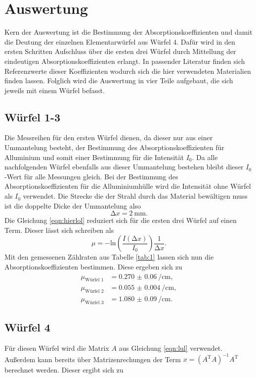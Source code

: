 \section{Auswertung}
Kern der Auswertung ist die Bestimmung der Absorptionskoeffizienten und damit die Deutung der einzelnen Elementarwürfel aus Würfel 4.
Dafür wird in den ersten Schritten Aufschluss über die ersten drei Würfel durch Mittellung der eindeutigen Absorptionskoeffizienten erlangt. 
In passender Literatur \cite{wqs} finden sich Referenzwerte dieser Koeffizienten wodurch sich die hier verwendeten Materialien finden lassen.  
Folglich wird die Auswertung in vier Teile aufgebaut, die sich jeweils mit einem Würfel befasst. 

\subsection{Würfel 1-3}
Die Messreihen für den ersten Würfel dienen, da dieser nur aus einer Ummantelung besteht, der Bestimmung des Absorptionskoeffizienten für Alluminium und somit einer Bestimmung 
für die Intensität $I_0$. Da alle nachfolgenden Würfel ebenfalls aus dieser Ummantelung bestehen bleibt dieser $I_0$-Wert für alle Messungen gleich. Bei der Bestimmung des Absorptionskoeffizienten für die Alluminiumhülle
wird die Intensität ohne Würfel als $I_0$ verwendet. 
Die Strecke die der Strahl durch das Material bewältigen muss ist die doppelte Dicke der Ummantelung also
\begin{equation*}
    \increment x = \SI{2}{\milli\meter}.
\end{equation*}
Die Gleichung \eqref{eqn:hierlol} reduziert sich für die ersten drei Würfel auf einen Term. Dieser lässt sich schreiben als
\begin{equation*}
\mu = - \text{ln} \left( \frac{I(\increment x)}{I_0} \right) \frac{1}{\increment x}.
\end{equation*}
Mit den gemessenen Zählraten aus Tabelle \ref{tab:1} lassen sich nun die Absorptionskoeffizienten bestimmen. Diese ergeben sich zu
\begin{align*}
\mu_{\text{Würfel 1}} &= \SI{0.270(60)}{\per\centi\meter},\\
\mu_{\text{Würfel 2}} &= \SI{0.055(4)}{\per\centi\meter},\\
\mu_{\text{Würfel 3}} &= \SI{1.080(90)}{\per\centi\meter}. 
\end{align*}
\subsection{Würfel 4}
Für diesen Würfel wird die Matrix $A$ aus Gleichung \eqref{eqn:lul} verwendet. Außerdem kann bereits über Matrizenrechungen der Term $x = (A^{\text{T}}A)^{-1} A^{\text{T}}$ berechnet werden. Dieser ergibt sich zu


